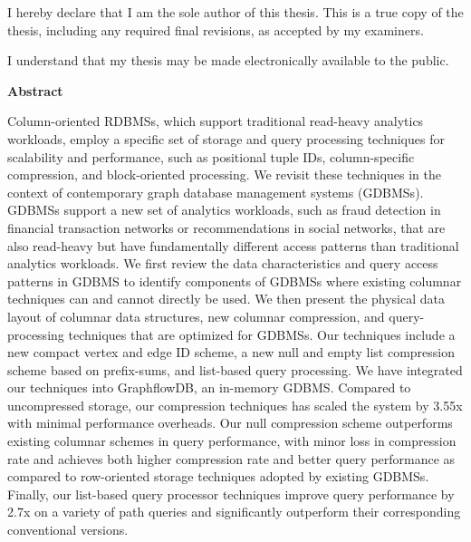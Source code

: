 \noindent
I hereby declare that I am the sole author of this thesis. This is a true copy of the thesis, including any required final revisions, as accepted by my examiners.

\bigskip
  
\noindent
I understand that my thesis may be made electronically available to the public.

\cleardoublepage


\begin{center}\textbf{Abstract}\end{center}

Column-oriented RDBMSs, which support traditional read-heavy analytics workloads, employ a specific set of storage and query processing techniques for scalability and performance, such as positional tuple IDs, column-specific compression, and block-oriented processing. We revisit these techniques in the context of contemporary graph database management systems (GDBMSs). GDBMSs support a new set of analytics workloads, such as fraud detection in financial transaction networks or recommendations in social networks, that are also read-heavy but have fundamentally different access patterns than traditional analytics workloads. We first review the data characteristics and query access patterns in GDBMS to identify components of GDBMSs where existing columnar techniques can and cannot directly be used. We then present the physical data layout of columnar data structures, new columnar compression, and query-processing techniques that are optimized for GDBMSs. Our techniques include a new compact vertex and edge ID scheme, a new null and empty list compression scheme based on prefix-sums, and list-based query processing. We have integrated our techniques into GraphflowDB, an in-memory GDBMS. Compared to uncompressed storage, our compression techniques has scaled the system by 3.55x with minimal performance overheads. Our null compression scheme outperforms existing columnar schemes in query performance, with minor loss in compression rate and achieves both higher compression rate and better query performance as compared to row-oriented storage techniques adopted by existing GDBMSs. Finally, our list-based query processor techniques improve query performance by 2.7x on a variety of path queries and significantly outperform their corresponding conventional versions.

\cleardoublepage


